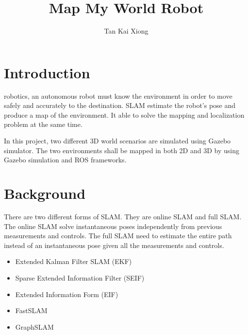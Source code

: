 \documentclass[10pt,journal,compsoc]{IEEEtran}
\begin{document}
\title{Map My World Robot}

\author{Tan Kai Xiong}

%
{}


\maketitle
\IEEEdisplaynontitleabstractindextext
\IEEEpeerreviewmaketitle
\section{Introduction}
\label{sec:introduction}

 robotics, an autonomous robot must know the environment in order to move safely and accurately to the destination. SLAM estimate the robot's pose and produce a map of the environment. It able to solve the mapping and localization problem at the same time.
    
In this project, two different 3D world scenarios are simulated using Gazebo simulator. The two environments shall be mapped in both 2D and 3D by using Gazebo simulation and ROS frameworks.

\section{Background}
There are two different forms of SLAM. They are online SLAM and full SLAM. The online SLAM solve instantaneous poses independently from previous measurements and controls. The full SLAM need to estimate the entire path instead of an instantaneous pose given all the measurements and controls.
\begin{itemize}
\item Extended Kalman Filter SLAM (EKF)
\item Sparse Extended Information Filter (SEIF)
\item Extended Information Form (EIF)
\item FastSLAM
\item GraphSLAM
\end {itemize}
\end{document}
